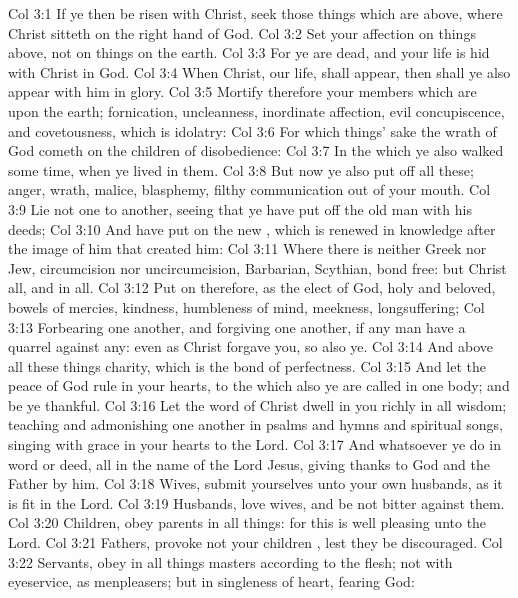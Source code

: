 \vs Col 3:1 If ye then be risen with Christ, seek those things which are above, where Christ sitteth on the right hand of God.
\vs Col 3:2 Set your affection on things above, not on things on the earth.
\vs Col 3:3 For ye are dead, and your life is hid with Christ in God.
\vs Col 3:4 When Christ,  our life, shall appear, then shall ye also appear with him in glory.
\vs Col 3:5 Mortify therefore your members which are upon the earth; fornication, uncleanness, inordinate affection, evil concupiscence, and covetousness, which is idolatry:
\vs Col 3:6 For which things' sake the wrath of God cometh on the children of disobedience:
\vs Col 3:7 In the which ye also walked some time, when ye lived in them.
\vs Col 3:8 But now ye also put off all these; anger, wrath, malice, blasphemy, filthy communication out of your mouth.
\vs Col 3:9 Lie not one to another, seeing that ye have put off the old man with his deeds;
\vs Col 3:10 And have put on the new , which is renewed in knowledge after the image of him that created him:
\vs Col 3:11 Where there is neither Greek nor Jew, circumcision nor uncircumcision, Barbarian, Scythian, bond  free: but Christ  all, and in all.
\vs Col 3:12 Put on therefore, as the elect of God, holy and beloved, bowels of mercies, kindness, humbleness of mind, meekness, longsuffering;
\vs Col 3:13 Forbearing one another, and forgiving one another, if any man have a quarrel against any: even as Christ forgave you, so also  ye.
\vs Col 3:14 And above all these things  charity, which is the bond of perfectness.
\vs Col 3:15 And let the peace of God rule in your hearts, to the which also ye are called in one body; and be ye thankful.
\vs Col 3:16 Let the word of Christ dwell in you richly in all wisdom; teaching and admonishing one another in psalms and hymns and spiritual songs, singing with grace in your hearts to the Lord.
\vs Col 3:17 And whatsoever ye do in word or deed,  all in the name of the Lord Jesus, giving thanks to God and the Father by him.
\vs Col 3:18 Wives, submit yourselves unto your own husbands, as it is fit in the Lord.
\vs Col 3:19 Husbands, love  wives, and be not bitter against them.
\vs Col 3:20 Children, obey  parents in all things: for this is well pleasing unto the Lord.
\vs Col 3:21 Fathers, provoke not your children , lest they be discouraged.
\vs Col 3:22 Servants, obey in all things  masters according to the flesh; not with eyeservice, as menpleasers; but in singleness of heart, fearing God:
